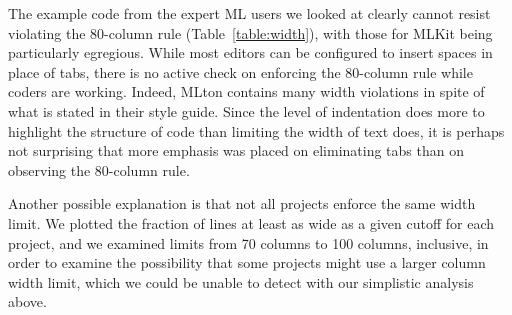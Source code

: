 \documentclass[12pt,abstracton]{scrartcl}
\begin{document}
The example code from the expert ML users we looked at clearly cannot
resist violating the 80-column rule (Table~\ref{table:width}), with
those for MLKit being particularly egregious. While most editors can be configured to insert
spaces in place of tabs, there is no active check on enforcing the 80-column
rule while coders are working.
Indeed, MLton contains many width violations in spite of what is stated in their style guide.
Since the level of indentation does more to highlight the structure of code than
limiting the width of text does, it is perhaps not surprising that more
emphasis was placed on eliminating tabs than on observing the 80-column rule.

Another possible explanation is that not all projects enforce the same width limit.
We plotted the fraction of lines at least as wide as a given cutoff for each project,
and we examined limits from 70 columns to 100 columns, inclusive, in order to
examine the possibility that some projects might use a larger column width limit,
which we could be unable to detect with our simplistic analysis above.
\end{document}
